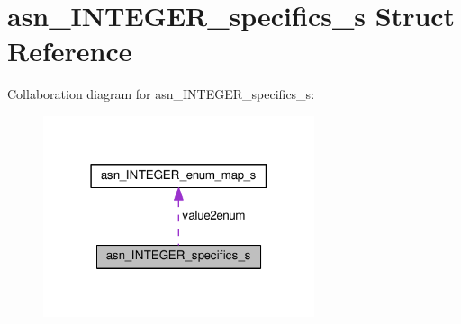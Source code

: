 \hypertarget{structasn__INTEGER__specifics__s}{}\section{asn\+\_\+\+I\+N\+T\+E\+G\+E\+R\+\_\+specifics\+\_\+s Struct Reference}
\label{structasn__INTEGER__specifics__s}


Collaboration diagram for asn\+\_\+\+I\+N\+T\+E\+G\+E\+R\+\_\+specifics\+\_\+s\+:\nopagebreak
\begin{figure}[H]
\begin{center}
\leavevmode
\includegraphics[width=226pt]{structasn__INTEGER__specifics__s__coll__graph}
\end{center}
\end{figure}
